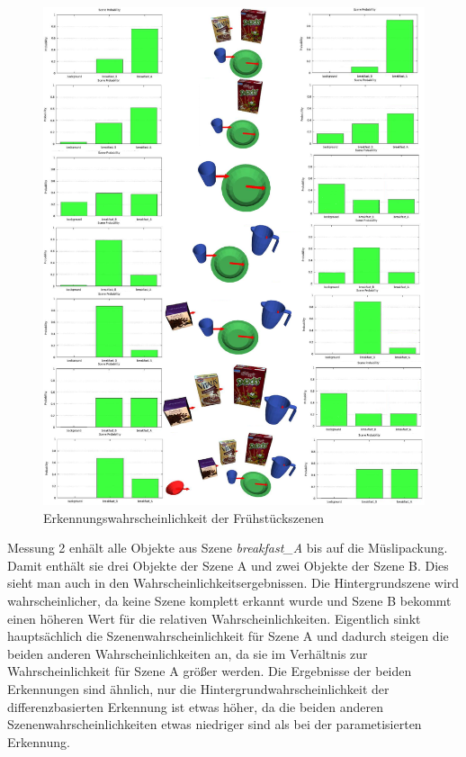 \begin{figure}
	\centering
	\includegraphics[width=14cm]{bilder/evaluationfruehstueckszenen.pdf}
	\caption{Erkennungswahrscheinlichkeit der Fr{\"u}hst{\"u}ckszenen \cite{gassner17}}
	\label{img:fruehstueck}
\end{figure}
Messung 2 enhält alle Objekte aus Szene \textit{breakfast\_A} bis auf die Müslipackung. Damit enthält sie drei Objekte der Szene A und zwei Objekte der Szene B. Dies sieht man auch in den Wahrscheinlichkeitsergebnissen. Die Hintergrundszene wird wahrscheinlicher, da keine Szene komplett erkannt wurde und  Szene B bekommt einen höheren Wert für die relativen Wahrscheinlichkeiten. Eigentlich sinkt hauptsächlich die Szenenwahrscheinlichkeit für Szene A und dadurch steigen die beiden anderen Wahrscheinlichkeiten an, da sie im Verhältnis zur Wahrscheinlichkeit für Szene A größer werden. Die Ergebnisse der beiden Erkennungen sind ähnlich, nur die Hintergrundwahrscheinlichkeit der differenzbasierten Erkennung ist etwas höher, da die beiden anderen Szenenwahrscheinlichkeiten etwas niedriger sind als bei der parametisierten Erkennung.\smallskip\\
